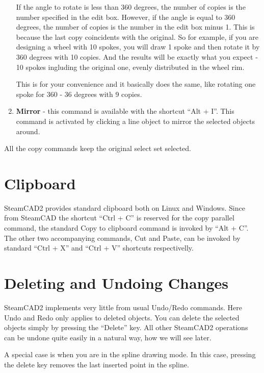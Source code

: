 \begin{enumerate}
If the angle to rotate is less than 360 degrees, the number of copies is the number
specified in the edit box. However, if the angle is equal to 360 degrees, the number
of copies is the number in the edit box minus 1. This is because the last copy
coincidents with the original. So for example, if you are designing a wheel with
10 spokes, you will draw 1 spoke and then rotate it by 360 degrees with 10 copies.
And the results will be exactly what you expect - 10 spokes ingluding the original one,
evenly distributed in the wheel rim.

This is for your convenience and it basically does the same, like rotating one spoke
for 360 - 36 degrees with 9 copies.
\item \textbf{Mirror} - this command is available with the shortcut ``Alt + I''.
This command is activated by clicking a line object to mirror the selected objects
around.
\end{enumerate}

All the copy commands keep the original select set selected.

\section{Clipboard}

SteamCAD2 provides standard clipboard both on Linux and Windows. Since from SteamCAD the
shortcut ``Ctrl + C'' is reserved for the copy parallel command, the standard Copy to
clipboard command is invoked by ``Alt + C''. The other two accompanying commands, Cut and
Paste, can be invoked by standard ``Ctrl + X'' and ``Ctrl + V'' shortcuts respectivelly.

\section{Deleting and Undoing Changes}

SteamCAD2 implements very little from usual Undo/Redo
commands. Here Undo and Redo only applies to deleted objects. You can delete the selected
objects simply by pressing the ``Delete'' key. All other SteamCAD2 operations can be
undone quite easily in a natural way, how we will see later.

A special case is when you are in the spline drawing mode. In this case, pressing the delete
key removes the last inserted point in the spline.

